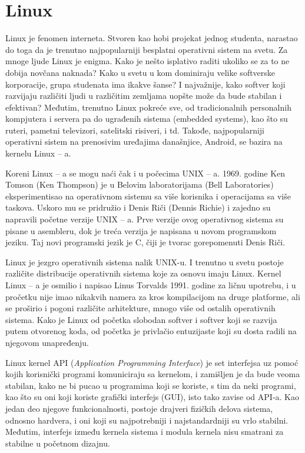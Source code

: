 \documentclass[a4paper, 12pt, diplomski]{etf}
\begin{document}
	\newpage

	\chapter{Linux}

	Linux je fenomen interneta. Stvoren kao hobi projekat jednog studenta, narastao do toga da je trenutno najpopularniji besplatni operativni sistem na svetu. Za mnoge ljude Linux je enigma. Kako je nešto isplativo raditi ukoliko se za to ne dobija novčana naknada? Kako u svetu u kom dominiraju velike softverske korporacije, grupa studenata ima ikakve šanse? I najvažnije, kako softver koji razvijaju različiti ljudi u različitim zemljama uopšte može da bude stabilan i efektivan? Međutim, trenutno Linux pokreće sve, od tradicionalnih personalnih kompjutera i servera pa do ugrađenih sistema (embedded systems), kao što su ruteri, pametni televizori, satelitski risiveri, i td. Takođe, najpopularniji operativni sistem na prenosivim uređajima današnjice, Android, se bazira na kernelu Linux – a.

	Koreni Linux – a se mogu naći čak i u počecima UNIX – a. 1969. godine Ken Tomson (Ken Thompson) je u Belovim laboratorijama (Bell Laboratories) eksperimentisao na operativnom sistemu sa više korisnika i operacijama sa više taskova. Uskoro mu se pridružio i Denis Riči (Dennis Richie) i zajedno su napravili početne verzije UNIX – a. Prve verzije ovog operativnog sistema su pisane u asembleru, dok je treća verzija je napisana u novom programskom jeziku. Taj novi programski jezik je C, čiji je tvorac gorepomenuti Denis Riči.

	Linux je jezgro operativnih sistema nalik UNIX-u. I trenutno u svetu postoje različite distribucije operativnih sistema koje za osnovu imaju Linux. Kernel Linux – a je osmilio i napisao Linus Torvalds 1991. godine za ličnu upotrebu, i u pročetku nije imao nikakvih namera za kros kompilacijom na druge platforme, ali se proširio i pogoni različite arhitekture, mnogo više od ostalih operativnih sistema. Kako je Linux od početka slobodan so\-ftver i softver koji se razvija putem otvorenog koda, od početka je privlačio entuzijaste koji su dosta radili na njegovom unapređenju.

	\bigskip

	Linux kernel API (\textit{Application Programming Interface}) je set interfejsa uz pomoć kojih korisnički programi komuniciraju sa kernelom, i zamišljen je da bude veoma stabilan, kako ne bi pucao u programima koji se koriste, s tim da neki programi, kao što su oni koji koriste grafički interfejs (GUI), isto tako zavise od API-a. Kao jedan deo njegove funkcionalnosti, postoje drajveri fizičkih delova sistema, odnosno hardvera, i oni koji su najpotrebniji i najstandardniji su vrlo stabilni. Međutim, interfejs između kernela sistema i modula kernela nisu smatrani za stabilne u početnom dizajnu.
\end{document}
